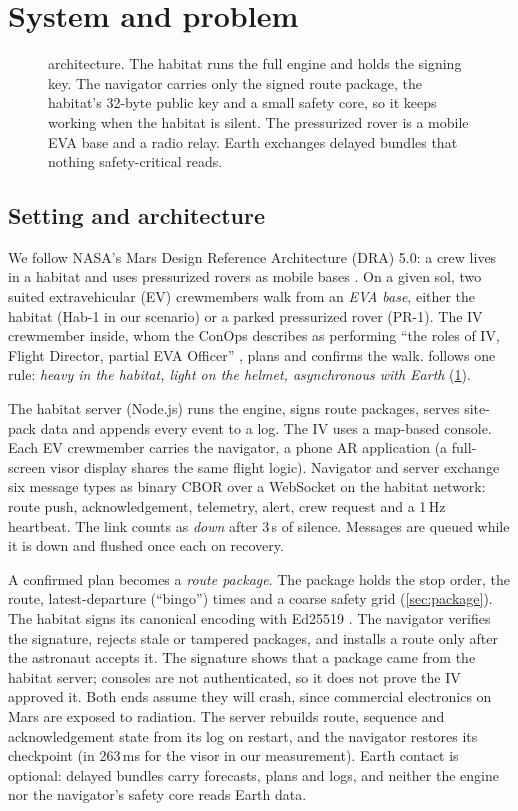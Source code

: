 \section{System and problem}
\label{sec:system}

\begin{figure}[t]
  \centering
  
  \caption{\Marswalk architecture. The habitat runs the full engine and holds the signing key. The navigator carries only the signed route package, the habitat's 32-byte public key and a small safety core, so it keeps working when the habitat is silent. The pressurized rover is a mobile EVA base and a radio relay. Earth exchanges delayed bundles that nothing safety-critical reads.}
  \label{fig:arch}
\end{figure}

\subsection{Setting and architecture}
We follow NASA's Mars Design Reference Architecture (DRA) 5.0: a crew lives in a habitat and uses pressurized rovers as mobile bases \citep{drake2009dra5}. On a given sol, two suited extravehicular (EV) crewmembers walk from an \emph{EVA base}, either the habitat (Hab-1 in our scenario) or a parked pressurized rover (PR-1). The IV crewmember inside, whom the ConOps describes as performing ``the roles of IV, Flight Director, partial EVA Officer'' \citep{coan2020conops}, plans and confirms the walk. \Marswalk follows one rule: \emph{heavy in the habitat, light on the helmet, asynchronous with Earth} (\cref{fig:arch}).

The habitat server (Node.js) runs the engine, signs route packages, serves site-pack data and appends every event to a log. The IV uses a map-based console. Each EV crewmember carries the navigator, a phone AR application (a full-screen visor display shares the same flight logic). Navigator and server exchange six message types as binary CBOR \citep{rfc8949} over a WebSocket on the habitat network: route push, acknowledgement, telemetry, alert, crew request and a 1\,Hz heartbeat. The link counts as \emph{down} after 3\,s of silence. Messages are queued while it is down and flushed once each on recovery.

A confirmed plan becomes a \emph{route package}. The package holds the stop order, the route, latest-departure (``bingo'') times and a coarse safety grid (\cref{sec:package}). The habitat signs its canonical encoding with Ed25519 \citep{bernstein2012,rfc8032}. The navigator verifies the signature, rejects stale or tampered packages, and installs a route only after the astronaut accepts it. The signature shows that a package came from the habitat server; consoles are not authenticated, so it does not prove the IV approved it. Both ends assume they will crash, since commercial electronics on Mars are exposed to radiation. The server rebuilds route, sequence and acknowledgement state from its log on restart, and the navigator restores its checkpoint (in 263\,ms for the visor in our measurement). Earth contact is optional: delayed bundles carry forecasts, plans and logs, and neither the engine nor the navigator's safety core reads Earth data.

